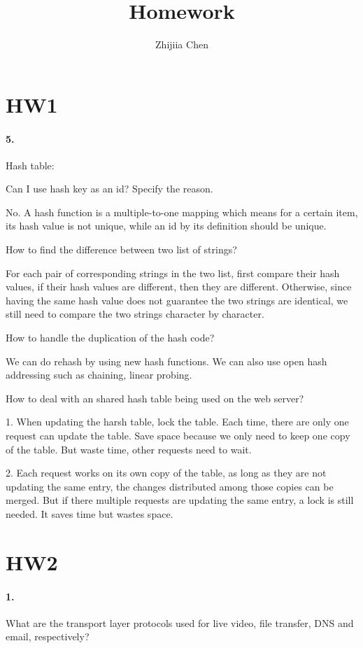\documentclass{article}
\title{Homework}
\author{Zhijiia Chen}
\begin{document}
\maketitle
\section{HW1}
\paragraph{5.} Hash table:

Can I use hash key as an id? Specify the reason.

No. A hash function is a multiple-to-one mapping which means for a certain item, its hash value is not unique, while an id by its definition should be unique.

How to find the difference between two list of strings?

For each pair of corresponding strings in the two list, first compare their hash values, if their hash values are different, then they are different. Otherwise, since having the same hash value does not guarantee the two strings are identical, we still need to compare the two strings character by character.

How to handle the duplication of the hash code?

We can do rehash by using new hash functions. We can also use open hash addressing such as chaining, linear probing.

How to deal with an shared hash table being used on the web server?

1. When updating the harsh table, lock the table. Each time, there are only one request can update the table. Save space because we only need to keep one copy of the table. But waste time, other requests need to wait.

2. Each request works on its own copy of the table, as long as they are not updating the same entry, the changes distributed among those copies can be merged. But if there multiple requests are updating the same entry, a lock is still needed. It saves time but wastes space.

\section{HW2}

\paragraph{1.} What are the transport layer protocols used for live video, file transfer, DNS and email, respectively?
\end{document}
